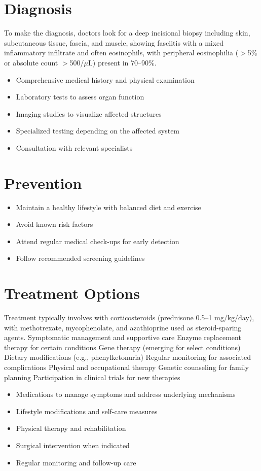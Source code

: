 \section{Diagnosis}
To make the diagnosis, doctors look for a deep incisional biopsy including skin, subcutaneous tissue, fascia, and muscle, showing fasciitis with a mixed inflammatory infiltrate and often eosinophils, with peripheral eosinophilia ($>$5\% or absolute count $>$500/$\mu$L) present in 70--90\%.

\begin{itemize}[noitemsep]
  \item Comprehensive medical history and physical examination
  \item Laboratory tests to assess organ function
  \item Imaging studies to visualize affected structures
  \item Specialized testing depending on the affected system
  \item Consultation with relevant specialists
\end{itemize}
\section{Prevention}
\begin{itemize}[noitemsep]
  \item Maintain a healthy lifestyle with balanced diet and exercise
  \item Avoid known risk factors
  \item Attend regular medical check-ups for early detection
  \item Follow recommended screening guidelines
\end{itemize}
\section{Treatment Options}
Treatment typically involves with corticosteroids (prednisone 0.5--1 mg/kg/day), with methotrexate, mycophenolate, and azathioprine used as steroid-sparing agents. Symptomatic management and supportive care Enzyme replacement therapy for certain conditions Gene therapy (emerging for select conditions) Dietary modifications (e.g., phenylketonuria) Regular monitoring for associated complications Physical and occupational therapy Genetic counseling for family planning Participation in clinical trials for new therapies

\begin{itemize}[noitemsep]
  \item Medications to manage symptoms and address underlying mechanisms
  \item Lifestyle modifications and self-care measures
  \item Physical therapy and rehabilitation
  \item Surgical intervention when indicated
  \item Regular monitoring and follow-up care
\end{itemize}
